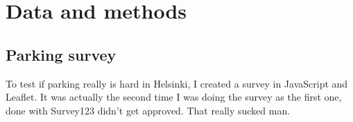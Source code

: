 \documentclass[../main.tex]{subfiles}
\begin{document}
\section{Data and methods}
\subsection{Parking survey}
\justify
To test if parking really is hard in Helsinki, I created a survey in JavaScript and Leaflet. It was actually the second time I was doing the survey as the first one, done with Survey123 didn't get approved. That really sucked man.
\end{document}
